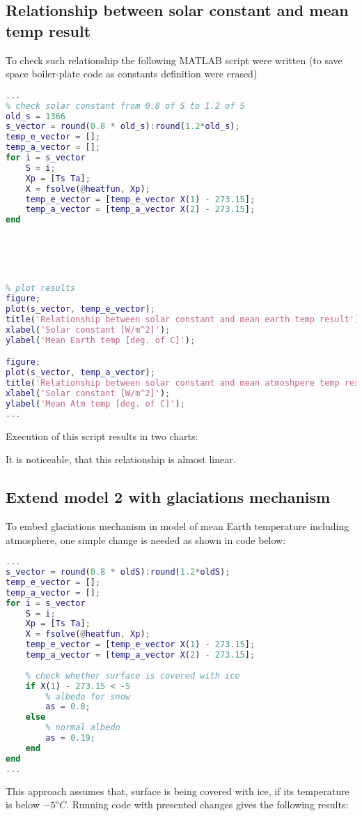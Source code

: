 \documentclass[onecolumn]{article}
\begin{document}
\subsection{Relationship between solar constant and mean temp result}
To check such relationship the following MATLAB script were written (to save space boiler-plate code as constants definition were erased)
\begin{lstlisting}[language=Matlab,frame=single,label={lst:autocorr},breaklines=true,caption={Correlation between solar constant and mean temperature script}]
...
% check solar constant from 0.8 of S to 1.2 of S
old_s = 1366
s_vector = round(0.8 * old_s):round(1.2*old_s);
temp_e_vector = [];
temp_a_vector = [];
for i = s_vector
    S = i;
    Xp = [Ts Ta];
    X = fsolve(@heatfun, Xp);
    temp_e_vector = [temp_e_vector X(1) - 273.15];
    temp_a_vector = [temp_a_vector X(2) - 273.15]; 
end





% plot results
figure;
plot(s_vector, temp_e_vector);
title('Relationship between solar constant and mean earth temp result');
xlabel('Solar constant [W/m^2]');
ylabel('Mean Earth temp [deg. of C]');

figure;
plot(s_vector, temp_a_vector);
title('Relationship between solar constant and mean atmoshpere temp result');
xlabel('Solar constant [W/m^2]');
ylabel('Mean Atm temp [deg. of C]');
...
\end{lstlisting}

Execution of this script results in two charts: \\
\noindent{}
\noindent{}

It is noticeable, that this relationship is almost linear.

\newpage
\subsection{Extend model 2 with glaciations mechanism}
To embed glaciations mechanism in model of mean Earth temperature including atmosphere, one simple change is needed as shown in code below:

\begin{lstlisting}[language=Matlab,frame=single,label={lst:autocorr},breaklines=true,caption={Correlation between solar constant and mean temperature script}]
...
s_vector = round(0.8 * oldS):round(1.2*oldS);
temp_e_vector = [];
temp_a_vector = [];
for i = s_vector
    S = i;
    Xp = [Ts Ta];
    X = fsolve(@heatfun, Xp);
    temp_e_vector = [temp_e_vector X(1) - 273.15];
    temp_a_vector = [temp_a_vector X(2) - 273.15];
    
    % check whether surface is covered with ice
    if X(1) - 273.15 < -5
        % albedo for snow
        as = 0.8; 
    else
        % normal albedo
        as = 0.19;
    end
end
...
\end{lstlisting}
This approach assumes that, surface is being covered with ice, if its temperature is below $-5^o C$. Running code with presented changes gives the following results:
\end{document}
